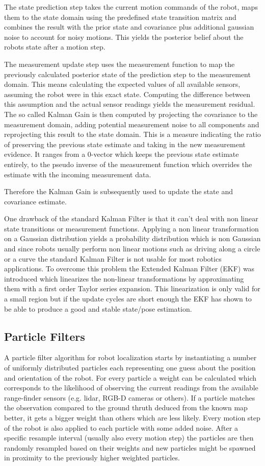 \documentclass[10pt,journal,compsoc]{IEEEtran}
\begin{document}
The state prediction step takes the current motion commands of the robot, maps them to the state domain using the predefined state transition matrix and combines the result with the prior state and covariance plus additional gaussian noise to account for noisy motions. This yields the posterior belief about the robots state after a motion step.

The measurement update step uses the measurement function to map the previously calculated posterior state of the prediction step to the measurement domain. This means calculating the expected values of all available sensors, assuming the robot were in this exact state. Computing the difference between this assumption and the actual sensor readings yields the measurement residual.
The so called Kalman Gain is then computed by projecting the covariance to the measurement domain, adding potential measurement noise to all components and reprojecting this result to the state domain. This is a measure indicating the ratio of preserving the previous state estimate and taking in the new measurement evidence. It ranges from a 0-vector which keeps the previous state estimate entirely, to the pseudo inverse of the measurement function which overrides the estimate with the incoming measurement data.

Therefore the Kalman Gain is subsequently used to update the state and covariance estimate.

One drawback of the standard Kalman Filter is that it can't deal with non linear state transitions or measurement functions. Applying a non linear transformation on a Gaussian distribution yields a probability distribution which is non Gaussian and since robots usually perform non linear motions such as driving along a circle or a curve the standard Kalman Filter is not usable for most robotics applications.
To overcome this problem the Extended Kalman Filter (EKF) was introduced which linearizes the non-linear transformations by approximating them with a first order Taylor series expansion. This linearization is only valid for a small region but if the update cycles are short enough the EKF has shown to be able to produce a good and stable state/pose estimation.


\subsection{Particle Filters}
A particle filter algorithm for robot localization starts by instantiating a number of uniformly distributed particles each representing one guess about the position and orientation of the robot. For every particle a weight can be calculated which corresponds to the likelihood of observing the current readings from the available range-finder sensors (e.g.  lidar, RGB-D cameras or others). If a particle matches the observation compared to the ground thruth deduced from the known map better, it gets a bigger weight than others which are less likely. Every motion step of the robot is also applied to each particle with some added noise. After a specific resample interval (usually also every motion step) the particles are then randomly resampled based on their weights and new particles might be spawned in proximity to the previously higher weighted particles. 
\end{document}
